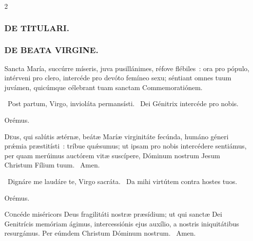 \documentclass[9pt,twoside]{extarticle}
\begin{document}
\begin{multicols}{2}
{{{\subsubsection*{\center \textsc{DE TITULARI.}}

\subsubsection*{\center \textsc{DE BEATA VIRGINE.}}
\begin{tightlist}{}
\item {}
\item {} Sancta María, succúrre míseris, juva pusillánimes, réfove flébiles~: ora pro pópulo, intérveni pro clero, intercéde pro devóto femíneo sexu; séntiant omnes tuum juvámen, quicúmque célebrant tuam sanctam Commemoratiónem.
\item {}
\item {}~Post partum, Virgo, invioláta permansísti. ~Dei Génitrix intercéde pro nobis.
\item Orémus. \hfill {}
\end{tightlist}
\lettrine{D}eus, qui salútis ætérnæ, beátæ Maríæ virginitáte fecúnda, humáno géneri prǽmia præstitísti~: tríbue quǽsumus; ut ipsam pro nobis intercédere sentiámus, per quam merúimus auctórem vitæ suscípere, Dóminum nostrum Jesum Christum Fílium tuum. ~Amen.

\begin{tightlist}{}
\item {}
\item {}~Dignáre me laudáre te, Virgo sacráta. ~Da mihi virtútem contra hostes tuos.
\item Orémus. \hfill {}
\end{tightlist}
\lettrine{C}oncéde miséricors Deus fragilitáti nostræ præsídium; ut qui sanctæ Dei Genitrícis memóriam ágimus, intercessiónis ejus auxílio, a nostris iniquitátibus resurgámus. Per eúmdem Christum Dóminum nostrum. ~Amen.

}}}
\end{multicols}
\end{document}
